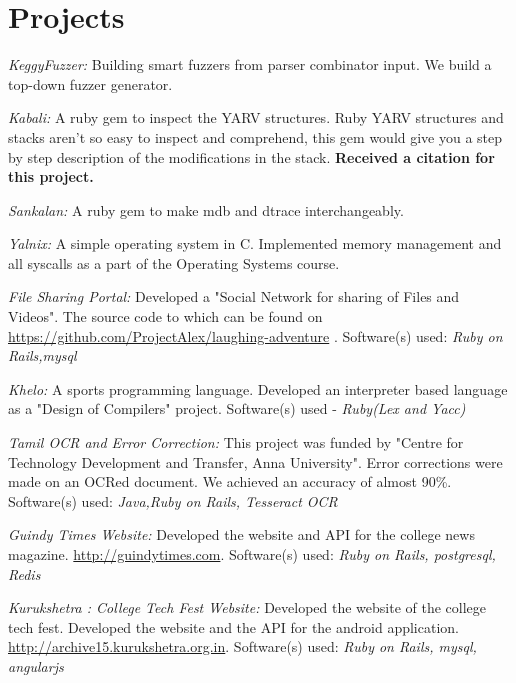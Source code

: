 \documentclass[letterpaper,10pt]{article}
\renewenvironment{itemize}{
  \begin{list}{}{
    \setlength{\leftmargin}{1.5em}
  }
}{
  \end{list}
}
\begin{document}
\section*{Projects}
\begin{itemize}
\setlength\itemsep{0ex}
\item \textit{KeggyFuzzer:} Building smart fuzzers from parser combinator input. We build a top-down fuzzer generator.
\item \textit{Kabali:} A ruby gem to inspect the YARV structures. Ruby YARV structures and stacks aren't so easy to inspect and comprehend, this gem would give you a step by step description of the modifications in the stack. {\bf Received a citation for this project.}
\item \textit{Sankalan:} A ruby gem to make mdb and dtrace interchangeably.
\item \textit{Yalnix:} A simple operating system in C. Implemented memory management and all syscalls as a part of the Operating Systems course.
\item \textit{File Sharing Portal:} Developed a "Social Network for sharing of Files and Videos". The source code to which can be found on \url{https://github.com/ProjectAlex/laughing-adventure} . Software(s) used: \textsl{Ruby on Rails,mysql}
\item \textit{Khelo:} A sports programming language. Developed an interpreter based language as a "Design of Compilers" project. Software(s) used -  \textsl{Ruby(Lex and Yacc)}

\item \textit{Tamil OCR and Error Correction:} This project was funded by "Centre for Technology Development and Transfer, Anna University". Error corrections were made on an OCRed document. We achieved an accuracy of almost 90\%. Software(s) used: \textsl{Java,Ruby on Rails, Tesseract OCR}

\item \textit{Guindy Times Website:} Developed the website and API for the college news magazine. \url{http://guindytimes.com}. Software(s) used: \textsl{Ruby on Rails, postgresql, Redis}
\item \textit{Kurukshetra : College Tech Fest Website:} Developed the website of the college tech fest. Developed the website and the API for the android application. \url{http://archive15.kurukshetra.org.in}. Software(s) used: \textsl{Ruby on Rails, mysql, angularjs}
\end{itemize}
\end{document}
